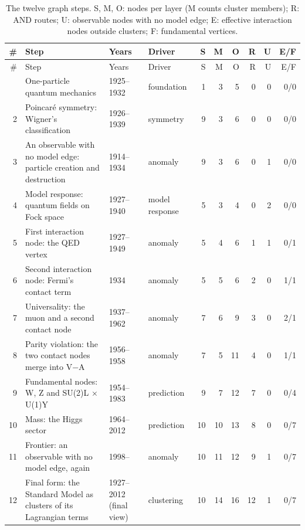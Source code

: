 \begingroup\small
\begin{longtable}{@{}r>{\raggedright\arraybackslash}p{3.9cm}l>{\raggedright\arraybackslash}p{2.9cm}rrrrrr@{}}
\caption{The twelve graph steps. S, M, O: nodes per layer (M counts cluster members); R: AND routes; U: observable nodes with no model edge; E: effective interaction nodes outside clusters; F: fundamental vertices.}\label{tab:steps}\\
\toprule\# & Step & Years & Driver & S & M & O & R & U & E/F\\\midrule\endfirsthead
\toprule\# & Step & Years & Driver & S & M & O & R & U & E/F\\\midrule\endhead
\bottomrule\endfoot
1 & One-particle quantum mechanics & 1925–1932 & foundation & 1 & 3 & 5 & 0 & 0 & 0/0\\
2 & Poincaré symmetry: Wigner's classification & 1926–1939 & symmetry & 9 & 3 & 6 & 0 & 0 & 0/0\\
3 & An observable with no model edge: particle creation and destruction & 1914–1934 & anomaly & 9 & 3 & 6 & 0 & 1 & 0/0\\
4 & Model response: quantum fields on Fock space & 1927–1940 & model response & 5 & 3 & 4 & 0 & 2 & 0/0\\
5 & First interaction node: the QED vertex & 1927–1949 & anomaly & 5 & 4 & 6 & 1 & 1 & 0/1\\
6 & Second interaction node: Fermi's contact term & 1934 & anomaly & 5 & 5 & 6 & 2 & 0 & 1/1\\
7 & Universality: the muon and a second contact node & 1937–1962 & anomaly & 7 & 6 & 9 & 3 & 0 & 2/1\\
8 & Parity violation: the two contact nodes merge into V−A & 1956–1958 & anomaly & 7 & 5 & 11 & 4 & 0 & 1/1\\
9 & Fundamental nodes: W, Z and SU(2)L × U(1)Y & 1954–1983 & prediction & 9 & 7 & 12 & 7 & 0 & 0/4\\
10 & Mass: the Higgs sector & 1964–2012 & prediction & 10 & 10 & 13 & 8 & 0 & 0/7\\
11 & Frontier: an observable with no model edge, again & 1998– & anomaly & 10 & 11 & 12 & 9 & 1 & 0/7\\
12 & Final form: the Standard Model as clusters of its Lagrangian terms & 1927–2012 (final view) & clustering & 10 & 14 & 16 & 12 & 1 & 0/7\\
\end{longtable}
\endgroup
